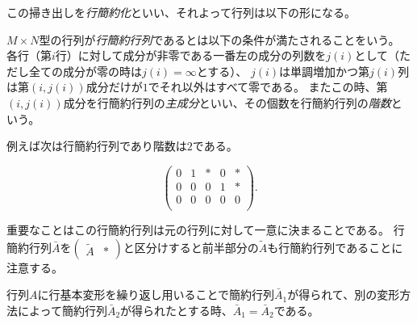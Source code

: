 この掃き出しを\emph{行簡約化}といい、それよって行列は以下の形になる。

\begin{definition}[行簡約行列]
$M\times N$型の行列が\emph{行簡約行列}であるとは以下の条件が満たされることをいう。
各行（第$i$行）に対して成分が非零である一番左の成分の列数を$j(i)$として（ただし全ての成分が零の時は$j(i) = \infty$とする）、
$j(i)$は単調増加かつ第$j(i)$列は第$(i, j(i))$成分だけが$1$でそれ以外はすべて零である。
またこの時、第$(i, j(i))$成分を行簡約行列の\emph{主成分}といい、その個数を行簡約行列の\emph{階数}という。
\end{definition}

例えば次は行簡約行列であり階数は$2$である。

$$
\begin{pmatrix}
0 & 1 & * & 0 & * \\
0 & 0 & 0 & 1 & * \\
0 & 0 & 0 & 0 & 0 \\
\end{pmatrix}.
$$

重要なことはこの行簡約行列は元の行列に対して一意に決まることである。
行簡約行列$\bar{A}$を$\begin{pmatrix}\tilde{A} & *\end{pmatrix}$と区分けすると前半部分の$\tilde{A}$も行簡約行列であることに注意する。

\begin{theorem}[行簡約行列の一意性]
行列$A$に行基本変形を繰り返し用いることで簡約行列$\bar{A}_1$が得られて、別の変形方法によって簡約行列$\bar{A}_2$が得られたとする時、$\bar{A}_1 = \bar{A}_2$である。
\end{theorem}

